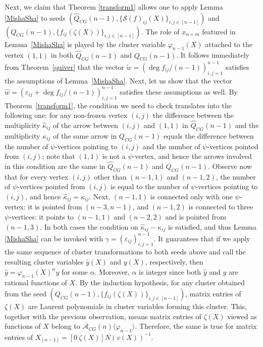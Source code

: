 \documentclass{amsart}
\theoremstyle{definition}
\theoremstyle{remark}
\numberwithin{equation}{section}
\numberwithin{theorem}{section}
\begin{document}
Next, we claim  that Theorem \ref{transform1}  allows one to apply Lemma \ref{MishaSha} to seeds
$(\hat Q_{CG}(n-1), \{ \mathcal S(f)_{ij}(X) \}_{i,j\in[n-1]})$ and  
$(  Q_{CG}(n-1), \{ f_{ij}(\zeta(X)) \}_{i,j\in[n-1]})$.  The role
of $x_{n+m}$ featured in  Lemma~\ref{MishaSha} is played by the cluster variable ${{\varphi}}_{n-1}(X)$ 
attached to the  vertex $(1,1)$  in both $\hat Q_{CG}(n-1)$ and $Q_{CG}(n-1)$. It follows immediately from
Theorem~\ref{quiver} that the vector $\tilde w=({{\operatorname{deg}}} f_{ij}/(n-1))_{i,j=1}^{n-1}$ satisfies the assumptions
of Lemma~\ref{MishaSha}. Next, let us show that the vector $\hat w=(\varepsilon_{ij}+{{\operatorname{deg}}} f_{ij}/(n-1))_{i,j=1}^{n-1}$ satisfies these assumptions as well.
 By Theorem~\ref{transform1}, the condition we need to check
translates into the following one: for any non-frozen vertex $(i,j)$ the difference between the multiplicity 
$\hat \kappa_{ij}$ of the arrow between $(i,j)$ and $ (1,1)$ in $\hat Q_{CG}(n-1)$ 
and the multiplicity $\kappa_{ij}$ of the same arrow
in $Q_{CG}(n-1)$ equals the  difference 
between the number of ${{\psi}}$-vertices pointing to $(i,j)$ and the number of ${{\psi}}$-vertices pointed from 
$(i,j)$; note that $(1,1)$ is not a ${{\psi}}$-vertex, and hence  the arrows
involved in this condition are the same in $\hat Q_{CG}(n-1)$ and $Q_{CG}(n-1)$. Observe now that for every vertex $(i,j)$ 
other than $(n-1,1)$ and $(n-1,2)$, the number of ${{\psi}}$-vertices pointed from $(i,j)$ 
 is equal to the number of ${{\psi}}$-vertices pointing to $(i,j)$, and hence 
$\hat \kappa_{ij}= \kappa_{ij}$. Next, 
$(n-1,1)$ is connected only with one ${{\psi}}$-vertex: it is pointed from $(n-3,n-1)$, 
and $(n-1,2)$ is connected to three ${{\psi}}$-vertices: it points to
$(n-1,1)$ and $(n-2,2)$  and is pointed from $(n-1,3)$. 
In both cases the condition on 
$\hat \kappa_{ij}-\kappa_{ij}$ is satisfied, and thus Lemma \ref{MishaSha} can be invoked
with  $\gamma=(\varepsilon_{ij})_{i,j=1}^{n-1}$.
It guarantees that if
we apply the same sequence of  cluster transformations to both seeds above and call the resulting cluster variables $\hat y (X)$ and $y(X)$, respectively, then $\hat y = {{\varphi}}_{n-1}(X)^{\alpha} y$ for some $\alpha$.  
Moreover, $\alpha$ is integer since both $\hat y$ and $y$ are rational functions of $X$. By the induction hypothesis, for any cluster obtained from the seed $(  Q_{CG}(n-1), \{ f_{ij}(\zeta(X)) \}_{i,j\in[n-1]})$,
 matrix entries of $\zeta(X)$ are Laurent polynomials in cluster variables forming this cluster. This, together with the previous observation, means
matrix entries of $\zeta(X)$
viewed as functions of $X$  belong to ${\overline{{\mathcal A}}}_{CG}(n)\langle {{\varphi}}_{n-1}\rangle $.
Therefore, the same is true for matrix entries of $X_{[n-1]}= \left [ 0\ \zeta(X) \right ] N(v(X))^{-1}$. 
\end{document}

